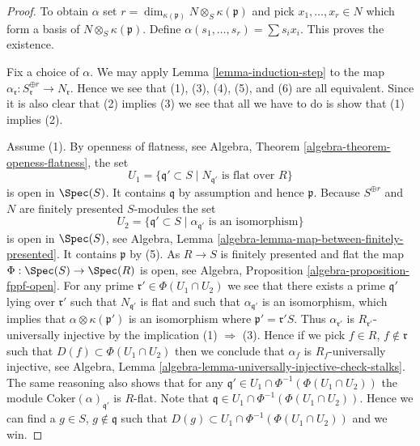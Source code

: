 \begin{proof}
To obtain $\alpha$ set
$r = \dim_{\kappa(\mathfrak p)} N \otimes_S \kappa(\mathfrak p)$ and pick
$x_1, \ldots, x_r \in N$ which form a basis of
$N \otimes_S \kappa(\mathfrak p)$. Define
$\alpha(s_1, \ldots, s_r) = \sum s_i x_i$. This proves the existence.

\medskip\noindent
Fix a choice of $\alpha$.
We may apply
Lemma \ref{lemma-induction-step}
to the map
$\alpha_{\mathfrak r} : S_{\mathfrak r}^{\oplus r} \to N_{\mathfrak r}$.
Hence we see that (1), (3), (4), (5), and (6) are all equivalent.
Since it is also clear that (2) implies (3) we see that all we have to
do is show that (1) implies (2).

\medskip\noindent
Assume (1). By openness of flatness, see
Algebra, Theorem \ref{algebra-theorem-openess-flatness},
the set
$$
U_1 = \{\mathfrak q' \subset S \mid N_{\mathfrak q'}\text{ is flat over }R\}
$$
is open in $\Spec(S)$. It contains $\mathfrak q$ by assumption
and hence $\mathfrak p$. Because $S^{\oplus r}$ and $N$ are finitely presented
$S$-modules the set
$$
U_2 = \{\mathfrak q' \subset S \mid
\alpha_{\mathfrak q'}\text{ is an isomorphism}\}
$$
is open in $\Spec(S)$, see
Algebra, Lemma \ref{algebra-lemma-map-between-finitely-presented}.
It contains $\mathfrak p$ by (5). As $R \to S$
is finitely presented and flat the map
$\Phi : \Spec(S) \to \Spec(R)$ is open, see
Algebra, Proposition \ref{algebra-proposition-fppf-open}.
For any prime $\mathfrak r' \in \Phi(U_1 \cap U_2)$ we see that
there exists a prime $\mathfrak q'$ lying over $\mathfrak r'$ such that
$N_{\mathfrak q'}$ is flat and such that $\alpha_{\mathfrak q'}$ is
an isomorphism, which implies that $\alpha \otimes \kappa(\mathfrak p')$
is an isomorphism where $\mathfrak p' = \mathfrak r' S$. Thus
$\alpha_{\mathfrak r'}$ is $R_{\mathfrak r'}$-universally injective
by the implication (1) $\Rightarrow$ (3).
Hence if we pick $f \in R$, $f \not \in \mathfrak r$ such that
$D(f) \subset \Phi(U_1 \cap U_2)$ then we conclude that
$\alpha_f$ is $R_f$-universally injective, see
Algebra, Lemma \ref{algebra-lemma-universally-injective-check-stalks}.
The same reasoning also shows that for any
$\mathfrak q' \in U_1 \cap \Phi^{-1}(\Phi(U_1 \cap U_2))$
the module $\text{Coker}(\alpha)_{\mathfrak q'}$ is $R$-flat.
Note that $\mathfrak q \in U_1 \cap \Phi^{-1}(\Phi(U_1 \cap U_2))$.
Hence we can find a $g \in S$, $g \not \in \mathfrak q$ such
that $D(g) \subset U_1 \cap \Phi^{-1}(\Phi(U_1 \cap U_2))$
and we win.
\end{proof}

